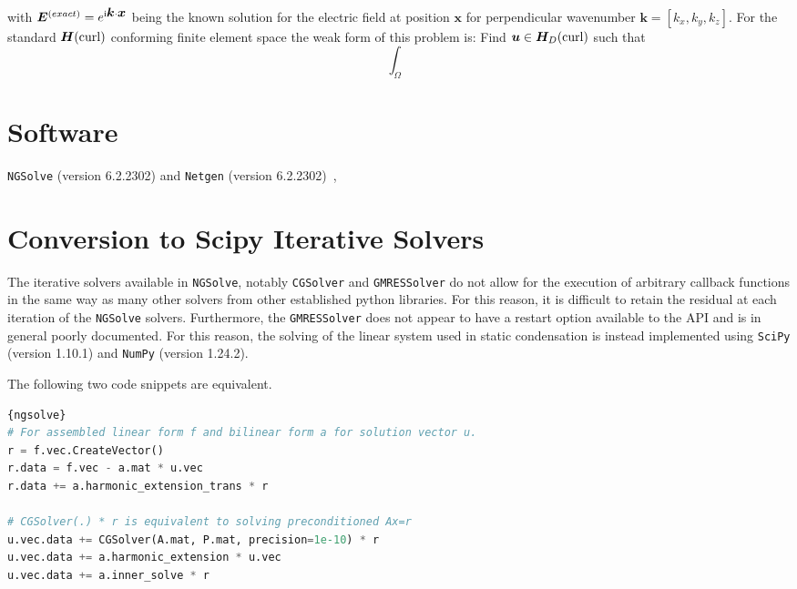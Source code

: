 \documentclass[a4paper,12]{elsarticle}
\theoremstyle{definition}
\renewcommand{\vec}[1]{\mbox{\boldmath$#1$}}
\begin{document}
with $\boldsymbol{E}^{(exact)} = e^{\rm{i} \vec{k} \cdot \vec{x}}$ being the known solution for the electric field at position $\boldsymbol{x}$ for perpendicular wavenumber $\boldsymbol{k} = \left[k_x, k_y, k_z\right]$. For the standard $\boldsymbol{H}(\rm{curl})$ conforming finite element space \cite{Monk2017} the weak form of this problem is: Find $\boldsymbol{u} \in \boldsymbol{H}_D(\rm{curl})$ such that
\begin{equation}
\int_\Omega
\end{equation}
\section{Software}
\texttt{NGSolve} (version 6.2.2302) and \texttt{Netgen} (version 6.2.2302)~\cite{NGSolve,zaglmayrphd,netgendet}, 

\section{Conversion to Scipy Iterative Solvers} \label{sect:scipy}
The iterative solvers available in \texttt{NGSolve}, notably \texttt{CGSolver} and \texttt{GMRESSolver} do not allow for the execution of arbitrary callback functions in the same way as many other solvers from other established python libraries. For this reason, it is difficult to retain the residual at each iteration of the \texttt{NGSolve} solvers. Furthermore, the \texttt{GMRESSolver} does not appear to have a restart option available to the API and is in general poorly documented. For this reason, the solving of the linear system used in static condensation is instead implemented using \texttt{SciPy} (version 1.10.1) and \texttt{NumPy} (version 1.24.2).

The following two code snippets are equivalent.
\clearpage
\begin{lstlisting}[caption=Static condensation using NGSolve,frame=tlrb, language=python]{ngsolve}
# For assembled linear form f and bilinear form a for solution vector u. 
r = f.vec.CreateVector()
r.data = f.vec - a.mat * u.vec
r.data += a.harmonic_extension_trans * r

# CGSolver(.) * r is equivalent to solving preconditioned Ax=r
u.vec.data += CGSolver(A.mat, P.mat, precision=1e-10) * r
u.vec.data += a.harmonic_extension * u.vec
u.vec.data += a.inner_solve * r
\end{lstlisting}
\end{document}
